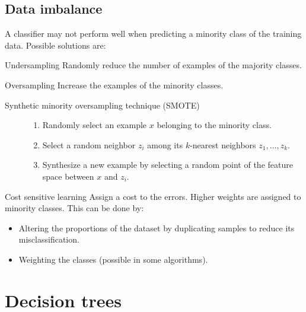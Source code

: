 \subsection{Data imbalance}
A classifier may not perform well when predicting a minority class of the training data.
Possible solutions are:
\begin{descriptionlist}
    \item[Undersampling] 
        Randomly reduce the number of examples of the majority classes.

    \item[Oversampling] 
        Increase the examples of the minority classes.

        \begin{description}
            \item[Synthetic minority oversampling technique (SMOTE)] 
                \begin{enumerate}
                    \item Randomly select an example $x$ belonging to the minority class.
                    \item Select a random neighbor $z_i$ among its $k$-nearest neighbors $z_1, \dots, z_k$.
                    \item Synthesize a new example by selecting a random point of the feature space between $x$ and $z_i$.
                \end{enumerate}
        \end{description}

    \item[Cost sensitive learning] 
        Assign a cost to the errors. Higher weights are assigned to minority classes.
        This can be done by:
        \begin{itemize}
            \item Altering the proportions of the dataset by duplicating samples to reduce its misclassification.
            \item Weighting the classes (possible in some algorithms).
        \end{itemize}
\end{descriptionlist}



\section{Decision trees}

